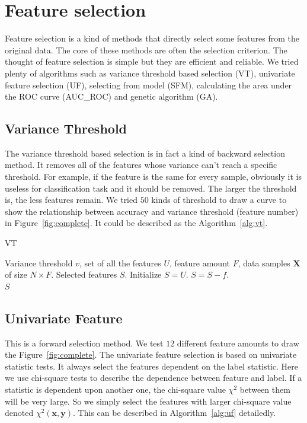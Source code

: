 \documentclass{article}
\newcommand{\Xmat}{{\boldsymbol X}}
\newcommand{\xv}{\boldsymbol{x}}
\newcommand{\yv}{\boldsymbol{y}}
\begin{document}
\section{Feature selection}
\label{sec:selection}
Feature selection is a kind of methods that directly select some features from the original data. The core of these methods are often the selection criterion. The thought of feature selection is simple but they are efficient and reliable. We tried plenty of algorithms such as variance threshold based selection (VT), univariate feature selection (UF), selecting from model (SFM), calculating the area under the ROC curve (AUC\_ROC) and genetic algorithm (GA).

\subsection{Variance Threshold}
The variance threshold based selection is in fact a kind of backward selection method. It removes all of the features whose variance can't reach a specific threshold. For example, if the feature is the same for every sample, obviously it is useless for classification task and it should be removed. The larger the threshold is, the less features remain. We tried $50$ kinds of threshold to draw a curve to show the relationship between accuracy and variance threshold (feature number) in Figure~\ref{fig:complete}. It could be described as the Algorithm~\ref{alg:vt}.

\begin{algorithm}
	\caption{VT}
	\label{alg:vt}
	\begin{algorithmic}[1]
		\REQUIRE Variance threshold $v$, set of all the features $U$, feature amount $F$, data samples $\Xmat$ of size $N\times F$.
		\ENSURE Selected features $S$.
		\STATE Initialize $S=U$.
			\IF{$Variance(\Xmat[:,f])<v$}
				\STATE $S = S-{f}$.
			\ENDIF
		\ENDFOR\\
		\RETURN $S$
	\end{algorithmic}
\end{algorithm}

\subsection{Univariate Feature}
This is a forward selection method. We test $12$ different feature amounts to draw the Figure~\ref{fig:complete}. The univariate feature selection is based on univariate statistic tests. It always select the features dependent on the label statistic. Here we use chi-square tests to describe the dependence between feature and label. If a statistic is dependent upon another one, the chi-square value $\chi^2$ between them will be very large. So we simply select the features with larger chi-square value denoted $\chi^2(\xv,\yv)$. This can be described in Algorithm~\ref{alg:uf} detailedly.
\end{document}
